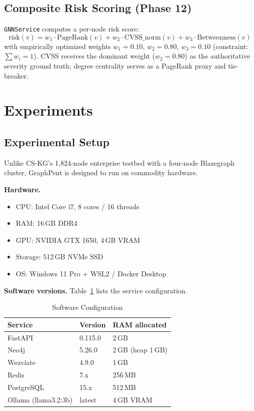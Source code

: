\documentclass[conference]{IEEEtran}
\begin{document}
\subsection{Composite Risk Scoring (Phase 12)}

\texttt{GNNService} computes a per-node risk score:
\begin{equation}
  \mathrm{risk}(v) = w_1 \cdot \mathrm{PageRank}(v)
                   + w_2 \cdot \mathrm{CVSS\_norm}(v)
                   + w_3 \cdot \mathrm{Betweenness}(v)
  \label{eq:risk}
\end{equation}
with empirically optimized weights $w_1 {=} 0.10$, $w_2 {=} 0.80$,
$w_3 {=} 0.10$ (constraint: $\sum w_i = 1$).
CVSS receives the dominant weight ($w_2{=}0.80$) as the authoritative
severity ground truth; degree centrality serves as a PageRank proxy and
tie-breaker.

\section{Experiments}

\subsection{Experimental Setup}

Unlike CS-KG's 1,824-node enterprise testbed with a four-node Blazegraph cluster,
GraphPent is designed to run on commodity hardware.

\textbf{Hardware.}
\begin{itemize}
  \item CPU: Intel Core i7, 8 cores / 16 threads
  \item RAM: 16\,GB DDR4
  \item GPU: NVIDIA GTX 1650, 4\,GB VRAM
  \item Storage: 512\,GB NVMe SSD
  \item OS: Windows 11 Pro + WSL2 / Docker Desktop
\end{itemize}

\textbf{Software versions.}
Table~\ref{tab:software} lists the service configuration.

\begin{table}[htbp]
  \centering
  \caption{Software Configuration}
  \label{tab:software}
  \begin{tabular}{lll}
    \toprule
    \textbf{Service} & \textbf{Version} & \textbf{RAM allocated} \\
    \midrule
    FastAPI      & 0.115.0 & 2\,GB \\
    Neo4j        & 5.26.0  & 2\,GB (heap 1\,GB) \\
    Weaviate     & 4.9.0   & 1\,GB \\
    Redis        & 7.x     & 256\,MB \\
    PostgreSQL   & 15.x    & 512\,MB \\
    Ollama (llama3.2:3b) & latest & 4\,GB VRAM \\
    \bottomrule
  \end{tabular}
\end{table}
\end{document}
